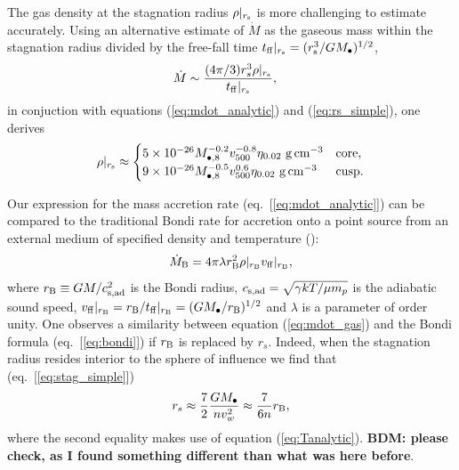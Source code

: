 \documentclass[usenatbib,fleqn]{mn2e}
\newcommand{\rs}{r_s}
\newcommand{\Mbh}[1][]{M_{\bullet#1}}
\newcommand{\Mbheight}{M_{\bullet,8}}
\newcommand{\vwO}{v_{w}}
\newcommand{\tff}{t_{\rm ff}}
\begin{document}
The gas density at the stagnation radius $\rho|_{r_{\rm s}}$ is more challenging to estimate accurately.  Using an alternative estimate of $\dot{M}$ as the gaseous mass within the stagnation radius divided by the free-fall time $t_{\rm ff}|_{r_{\rm s}} = (r_{\rm s}^{3}/GM_{\bullet})^{1/2}$,
\begin{align}
  &\dot{M}\sim\frac{(4 \pi/3) \rs^3 \rho|_{r_{\rm s}}}{\tff|_{r_{\rm s}}},
  \label{eq:mdot_gas}
\end{align}
 in conjuction with equations (\ref{eq:mdot_analytic}) and (\ref{eq:rs_simple}), one derives
\begin{align}
  \rho|_{r_{\rm s}}\approx
  \begin{cases}
    5 \times 10^{-26} \Mbheight^{-0.2} v_{500}^{-0.8}  \eta_{0.02} \,
    \, {\rm g \, cm^{-3}}& \text{core},\\
    9 \times 10^{-26}  \Mbheight^{-0.5} v_{500}^{0.6}  \eta_{0.02} \,\, {\rm g \,cm^{-3}} & \text{cusp}.
  \end{cases}
  \label{eq:rhors}
\end{align}


Our expression for the mass accretion rate (eq.~[\ref{eq:mdot_analytic}]) can be compared to the traditional Bondi rate for accretion onto a point source from an external medium of specified density and temperature (\citealt{Bondi52}):
\begin{align}
  \dot{M}_{\rm B} =4\pi \lambda r_{\rm B}^2 \rho|_{r_{\rm B}}v_{\rm ff}|_{r_{\rm B}},
\label{eq:bondi}
\end{align}
where $r_{\rm B} \equiv GM/c_{\rm s,ad}^{2}$ is the Bondi radius, $c_{\rm s,ad} = \sqrt{\gamma kT/\mu m_p}$ is the adiabatic sound speed, $v_{\rm ff}|_{r_{\rm B}} = r_{\rm B}/t_{\rm ff}|_{r_{\rm B}} = (GM_{\bullet}/r_{\rm B})^{1/2}$ and $\lambda$ is a parameter of order unity.  One observes a similarity between equation (\ref{eq:mdot_gas}) and the Bondi formula (eq.~[\ref{eq:bondi}]) if $r_{\rm B}$ is replaced by $\rs$.  Indeed, when the stagnation radius resides interior to the sphere of influence we find that (eq.~[\ref{eq:stag_simple}])
\begin{align}
  \rs\approx\frac{7}{2}\frac{G \Mbh}{n \vwO^2} \approx \frac{7}{6n}r_{\rm B},
  \label{eq:rs_simple}
\end{align}
where the second equality makes use of equation (\ref{eq:Tanalytic}).  {\bf BDM: please check, as I found something different than what was here before}.   
\end{document}
